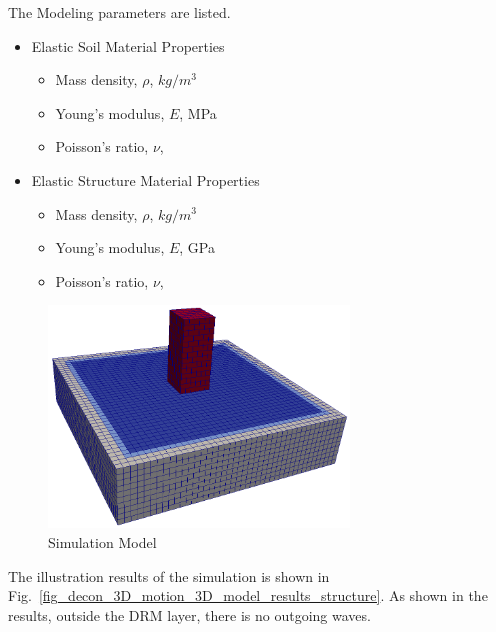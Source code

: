 The Modeling parameters are listed.
\begin{itemize}
  \item Elastic Soil Material Properties 
  \begin{itemize}
    \item Mass density, $\rho$, \enspace {} $kg/m^3$
    \item Young's modulus, $E$, \enspace {} MPa
    \item Poisson's ratio, $\nu$, \enspace {}
  \end{itemize}
  \item Elastic Structure Material Properties 
  \begin{itemize}
    \item Mass density, $\rho$, \enspace {} $kg/m^3$
    \item Young's modulus, $E$, \enspace {} GPa
    \item Poisson's ratio, $\nu$, \enspace {}
  \end{itemize}
\end{itemize}

\begin{figure}[H]
  \centering
  \includegraphics[width = 8cm]{./Figure-files/Day2/Deconvolution_3by1D_Motions/Earthquake_Soil-Structure_Interaction_3D_Model_with_DRM/overview.png}
  \caption{Simulation Model}
  \label{fig_decon_1D_motion_3D_model3}
\end{figure}


The illustration results of the simulation is shown in Fig.~\ref{fig_decon_3D_motion_3D_model_results_structure}.
As shown in the results, outside the DRM layer, there is no outgoing waves. 

